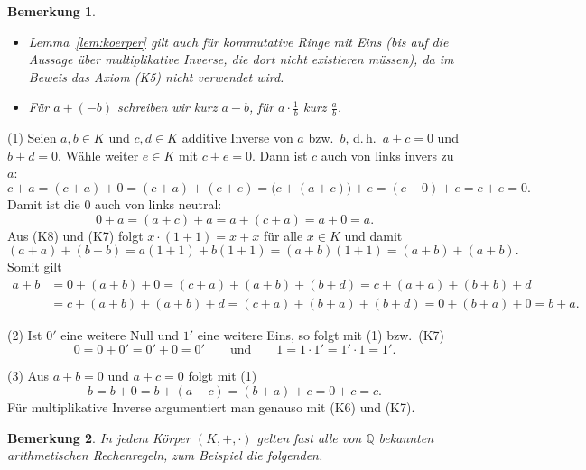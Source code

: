 \documentclass[a4paper]{article}
\makeatletter
\theoremstyle{kurzskript}
\newtheorem*{bem}{Bemerkung}
\renewenvironment{proof}[1][\proofname]{\par\pushQED{\qed}%
  \normalfont\topsep\medskipamount\relax
  \trivlist\item[\hskip\labelsep\bfseries #1\@addpunct{.}]\ignorespaces}%
  {\popQED\endtrivlist\@endpefalse}
\renewcommand{\proofname}{Beweis}
\newcommand{\Q}{\mathbb{Q}}
\makeatother
\begin{document}
\begin{bem}
\leavevmode
\begin{itemize}
  \item Lemma~\ref{lem:koerper} gilt auch für kommutative Ringe mit Eins (bis auf die Aussage über multiplikative Inverse, die dort nicht existieren müssen), da im Beweis das Axiom (K5) nicht verwendet wird.
  \item Für $a + (-b)$ schreiben wir kurz $a - b$, für $a \cdot \frac{1}{b}$ kurz $\frac{a}{b}$.
\end{itemize}
\end{bem}

\begin{proof}[Beweis von Lemma~\ref{lem:koerper}]
(1) Seien $a, b \in K$ und $c, d \in K$ additive Inverse von $a$ bzw.\ $b$, d.\,h.\ $a + c = 0$ und $b + d = 0$. Wähle weiter $e \in K$ mit $c + e = 0$. Dann ist $c$ auch \glqq von links\grqq{} invers zu $a$:
\[
  c + a = (c + a) + 0 = (c + a) + (c + e) = \bigl(c + (a + c)\bigr) + e = (c + 0) + e = c + e = 0.
\]
Damit ist die $0$ auch von links neutral:
\[
  0 + a = (a + c) + a = a + (c + a) = a + 0 = a.
\]
Aus (K8) und (K7) folgt $x \cdot (1 + 1) = x + x$ für alle $x \in K$ und damit
\[
  (a + a) + (b + b) = a(1 + 1) + b(1 + 1) = (a + b)(1 + 1) = (a + b) + (a + b).
\]
Somit gilt
\begin{align*}
  a + b &= 0 + (a + b) + 0 = (c + a) + (a + b) + (b + d) = c + (a + a) + (b + b) + d\\
        &= c + (a + b) + (a + b) + d = (c + a) + (b + a) + (b + d) = 0 + (b + a) + 0 = b + a.
\end{align*}

(2) Ist $0'$ eine weitere Null und $1'$ eine weitere Eins, so folgt mit (1) bzw.\ (K7)
\[
  0 = 0 + 0' = 0' + 0 = 0' \qquad\text{und}\qquad 1 = 1 \cdot 1' = 1' \cdot 1 = 1'.
\]

(3) Aus $a + b = 0$ und $a + c = 0$ folgt mit (1)
\[
  b = b + 0 = b + (a + c) = (b + a) + c = 0 + c = c.
\]
Für multiplikative Inverse argumentiert man genauso mit (K6) und (K7).
\end{proof}

\begin{bem}
In jedem Körper $(K, +, \cdot)$ gelten fast alle von $\Q$ bekannten arithmetischen Rechenregeln, zum Beispiel die folgenden.
\end{bem}
\end{document}
